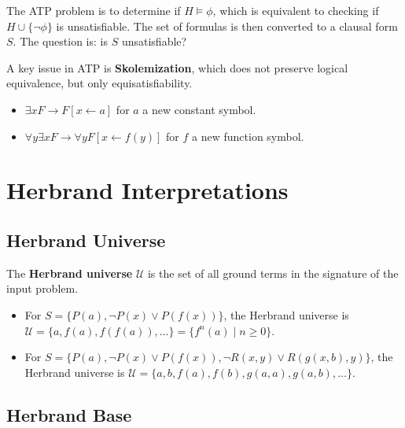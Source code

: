 \documentclass[11pt,a4paper]{article}
\theoremstyle{definition}
\theoremstyle{plain}
\theoremstyle{remark}
\begin{document}
The ATP problem is to determine if $H \models \phi$, which is equivalent to checking if $H \cup \{\neg \phi\}$ is unsatisfiable. The set of formulas is then converted to a clausal form $S$. The question is: is $S$ unsatisfiable?



A key issue in ATP is \textbf{Skolemization}, which does not preserve logical equivalence, but only equisatisfiability.

\begin{itemize}

    \item $\exists x F \longrightarrow F[x \leftarrow a]$ for $a$ a new constant symbol.

    \item $\forall y \exists x F \longrightarrow \forall y F[x \leftarrow f(y)]$ for $f$ a new function symbol.

\end{itemize}



\section{Herbrand Interpretations}



\subsection{Herbrand Universe}

The \textbf{Herbrand universe} $\mathcal{U}$ is the set of all ground terms in the signature of the input problem.

\begin{itemize}

    \item For $S = \{ P(a), \neg P(x) \vee P(f(x)) \}$, the Herbrand universe is $\mathcal{U} = \{ a, f(a), f(f(a)), \dots \} = \{ f^n(a) \mid n \geq 0 \}$.

    \item For $S = \{ P(a), \neg P(x) \vee P(f(x)), \neg R(x, y) \vee R(g(x, b), y) \}$, the Herbrand universe is $\mathcal{U} = \{ a, b, f(a), f(b), g(a, a), g(a, b), \dots \}$.

\end{itemize}



\subsection{Herbrand Base}
\end{document}
